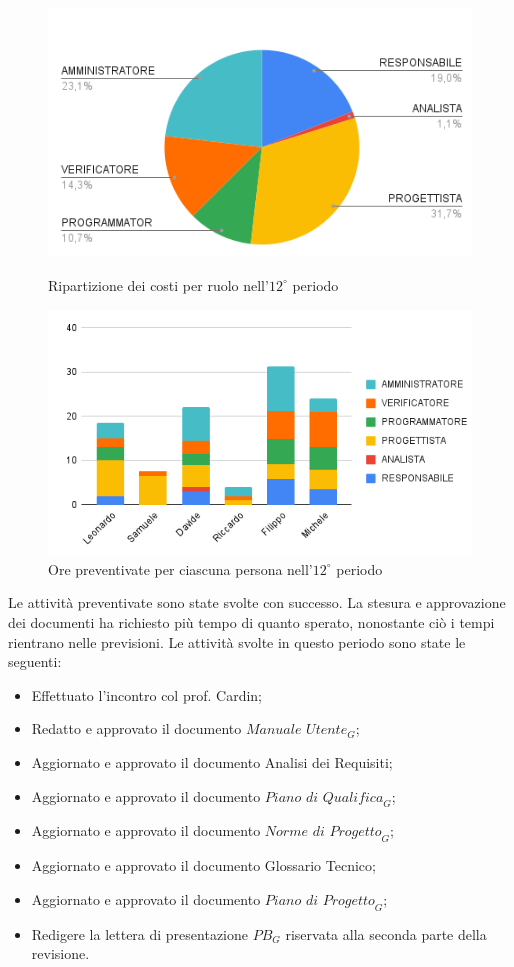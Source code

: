 \begin{figure}[H]
    \centering
    \includegraphics[width=0.6\linewidth]{grafici/12_periodo_torta.png}
    \caption{Ripartizione dei costi per ruolo nell'$12^\circ$ periodo}
        \vspace{5mm}
    \includegraphics[width=0.7\linewidth]{grafici/12_periodo_istogramma.png}
    \caption{Ore preventivate per ciascuna persona nell'$12^\circ$ periodo}
\end{figure}
Le attività preventivate sono state svolte con successo. La stesura e approvazione dei documenti ha richiesto più tempo di quanto sperato, nonostante ciò i tempi rientrano nelle previsioni.
Le attività svolte in questo periodo sono state le seguenti:
\begin{itemize}
    \item Effettuato l'incontro col prof. Cardin;
    \item Redatto e approvato il documento $\textit{Manuale Utente}_G$;
    \item Aggiornato e approvato il documento Analisi dei Requisiti;
    \item Aggiornato e approvato il documento $\textit{Piano di Qualifica}_G$;
    \item Aggiornato e approvato il documento $\textit{Norme di Progetto}_G$;
    \item Aggiornato e approvato il documento Glossario Tecnico;
    \item Aggiornato e approvato il documento $\textit{Piano di Progetto}_G$;
    \item Redigere la lettera di presentazione $\textit{PB}_G$ riservata alla seconda parte della revisione.
\end{itemize}

